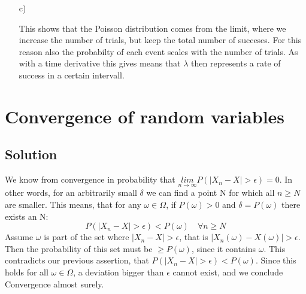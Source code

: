 \documentclass[10pt]{article}
\numberwithin{equation}{section}
\begin{document}
\begin{enumerate}
{}
\item[c)]{
This shows that the Poisson distribution comes from the limit, where we increase the number of trials, but keep the total number of succeses. For this reason also the probabilty of each event scales with the number of trials. As with a time derivative this gives means that $\lambda$ then represents a rate of success in a certain intervall. 



}
\end{enumerate}

\section*{Convergence of random variables}
\subsection*{Solution}
We know from convergence in probability that $\underset{n\rightarrow \infty}{lim}P(|X_n - X| > \epsilon) = 0$. In other words, for an arbitrarily small $\delta$ we can find a point N for which all $n\geq N$ are smaller.
This means, that for any $\omega \in \Omega$, if $P(\omega) > 0$  and $\delta = P(\omega)$ there exists an N:
$$P(|X_n - X| > \epsilon) < P(\omega)\quad \forall n \geq N$$
Assume $\omega$ is part of the set where $|X_n -X|> \epsilon$, that is $|X_n(\omega) -X(\omega)|> \epsilon$.
Then the probability of this set must be $\geq P(\omega)$, since it contains $\omega$. This contradicts our previous assertion, that $P(|X_n - X| > \epsilon) < P(\omega)$.
Since this holds for all $\omega \in \Omega$, a deviation bigger than $\epsilon$ cannot exist, and we conclude Convergence almost surely.
\end{document}
